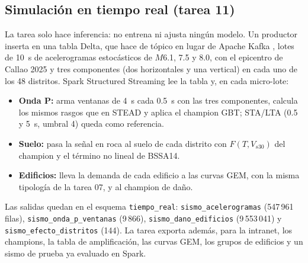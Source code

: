 \documentclass[conference]{IEEEtran}%
\newcommand{\vs}{V_{s30}}
\begin{document}
\subsection{Simulación en tiempo real (tarea 11)}
La tarea solo hace inferencia: no entrena ni ajusta ningún modelo. Un productor inserta en una tabla Delta, que hace de tópico en lugar de Apache Kafka \cite{kreps2011kafka}, lotes de 10~s de acelerogramas estocásticos \cite{boore2003} de $M$6.1, 7.5 y 8.0, con el epicentro de Callao 2025 y tres componentes (dos horizontales y una vertical) en cada uno de los 48 distritos. Spark Structured Streaming lee la tabla y, en cada micro-lote:
\begin{itemize}
  \item \textbf{Onda P:} arma ventanas de 4~s cada 0.5~s con las tres componentes, calcula los mismos rasgos que en STEAD y aplica el champion GBT; STA/LTA (0.5 y 5~s, umbral 4) queda como referencia.
  \item \textbf{Suelo:} pasa la señal en roca al suelo de cada distrito con $F(T,\vs)$ del champion y el término no lineal de BSSA14.
  \item \textbf{Edificios:} lleva la demanda de cada edificio a las curvas GEM, con la misma tipología de la tarea 07, y al champion de daño.
\end{itemize}
Las salidas quedan en el esquema \texttt{tiempo\_real}: \texttt{sismo\_acelerogramas} (547\,961 filas), \texttt{sismo\_onda\_p\_ventanas} (9\,866), \texttt{sismo\_dano\_edificios} (9\,553\,041) y \texttt{sismo\_efecto\_distritos} (144). La tarea exporta además, para la intranet, los champions, la tabla de amplificación, las curvas GEM, los grupos de edificios y un sismo de prueba ya evaluado en Spark.
\end{document}
